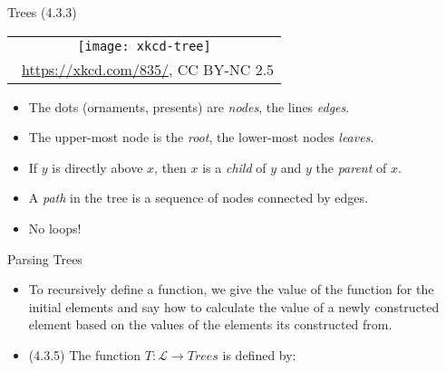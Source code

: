 \begin{frame}{Trees (4.3.3)}

	\begin{center}
		\begin{tabular}{c}
		\texttt{[image: xkcd-tree]}\\[-1ex]
		{\tiny \textcopyright~\url{https://xkcd.com/835/}, CC BY-NC 2.5}
		\end{tabular}
		\end{center}

	\begin{itemize}
		
		\item The dots (ornaments, presents) are {\it nodes}, the lines {\it edges}. 
		
		\item The upper-most node is the {\it root}, the lower-most nodes {\it leaves}. 
		
		\item If $y$ is directly above $x$, then $x$ is a {\it child} of $y$ and $y$ the \emph{parent} of $x$. 
		
		\item A {\it path} in the tree is a sequence of nodes connected by edges. 
		
		\item No loops!
		
	\end{itemize}

\end{frame}

\begin{frame}{Parsing Trees}

	\begin{itemize}
	
 		\item \alert{To recursively define a function, we give the value of the function for the initial elements and say how to calculate the value of a newly constructed element based on the values of the elements its constructed from.}
		
		\item (4.3.5) The function $T:\mathcal{L}\to Trees$ is defined by:
		
		\begin{center}
\end{center}

	\end{itemize}


\end{frame}

